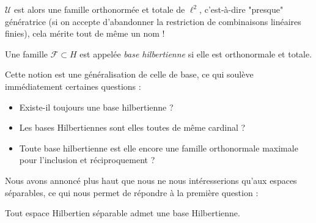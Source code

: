 	$\mathcal{U}$ est alors une famille orthonormée et totale de $\ell^2$, c'est-à-dire "presque" génératrice (si on accepte d'abandonner la restriction de combinaisons linéaires finies), cela mérite tout de même un nom !
	
	\begin{mydef}
		Une famille $\mathcal{F} \subset H$ est appelée \textit{base hilbertienne} si elle est orthonormale et totale.
	\end{mydef}
	
	Cette notion est une généralisation de celle de base, ce qui soulève immédiatement certaines questions :
	
	\begin{itemize}
		\item Existe-il toujours une base hilbertienne ?
		\item Les bases Hilbertiennes sont elles toutes de même cardinal ?
		\item Toute base hilbertienne est elle encore une famille orthonormale maximale pour l'inclusion et réciproquement ?
	\end{itemize}
	
	Nous avons annoncé plus haut que nous ne nous intéresserions qu'aux espaces séparables, ce qui nous permet de répondre à la première question :
	
	\begin{myproposition}
		Tout espace Hilbertien séparable admet une base Hilbertienne.
	\end{myproposition}
	
